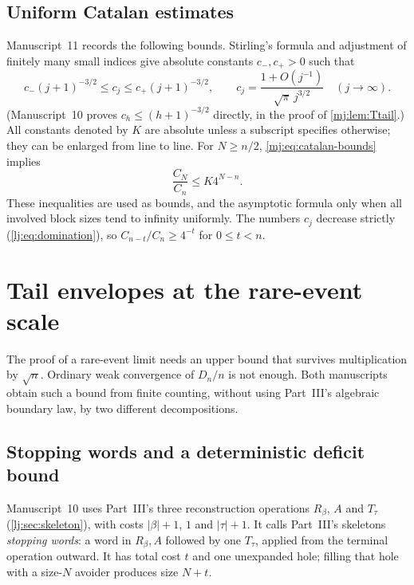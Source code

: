\documentclass[11pt,a4paper]{article}
\theoremstyle{definition}\newaliascnt{definition}{theorem}
\theoremstyle{remark}\newaliascnt{remark}{theorem}
\begin{document}
\subsection{Uniform Catalan estimates}
Manuscript~11 records the following bounds. Stirling's formula and
adjustment of finitely many small indices give absolute constants
$c_-,c_+>0$ such that
\begin{equation}
 c_-(j+1)^{-3/2}\le c_j\le c_+(j+1)^{-3/2},
 \qquad
 c_j=\frac{1+O(j^{-1})}{\sqrt\pi\,j^{3/2}}\quad(j\to\infty).
 \label{mj:eq:catalan-bounds}
\end{equation}
(Manuscript~10 proves $c_h\le(h+1)^{-3/2}$ directly, in the proof of
\cref{mj:lem:Ttail}.) All constants denoted by $K$ are absolute unless a
subscript specifies otherwise; they can be enlarged from line to line. For
$N\ge n/2$, \eqref{mj:eq:catalan-bounds} implies
\begin{equation}
 \frac{C_N}{C_n}\le K4^{N-n}.
 \label{mj:eq:catalan-ratio}
\end{equation}
These inequalities are used as bounds, and the asymptotic formula only when
all involved block sizes tend to infinity uniformly. The numbers $c_j$
decrease strictly (\eqref{lj:eq:domination}), so
$C_{n-t}/C_n\ge4^{-t}$ for $0\le t<n$.

\section{Tail envelopes at the rare-event scale}
\label{mj:sec:envelope}
The proof of a rare-event limit needs an upper bound that survives
multiplication by $\sqrt n$. Ordinary weak convergence of $D_n/n$ is not
enough. Both manuscripts obtain such a bound from finite counting, without
using Part~III's algebraic boundary law, by two different decompositions.

\subsection{Stopping words and a deterministic deficit bound}
Manuscript~10 uses Part~III's three reconstruction operations $R_\beta$, $A$
and $T_\tau$ (\cref{lj:sec:skeleton}), with costs $|\beta|+1$, $1$ and
$|\tau|+1$. It calls Part~III's skeletons \emph{stopping words}: a word in
$R_\beta,A$ followed by one $T_\tau$, applied from the terminal operation
outward. It has total cost $t$ and one unexpanded hole; filling that hole
with a size-$N$ avoider produces size $N+t$.
\end{document}
